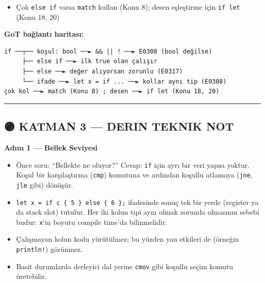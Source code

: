 \documentclass[12pt,a4paper]{article}
\newenvironment{Shaded}{}{}
\newcommand{\ControlFlowTok}[1]{\textcolor[rgb]{0.00,0.44,0.13}{\textbf{#1}}}
\newcommand{\DecValTok}[1]{\textcolor[rgb]{0.25,0.63,0.44}{#1}}
\newcommand{\NormalTok}[1]{#1}
\newcommand{\OperatorTok}[1]{\textcolor[rgb]{0.40,0.40,0.40}{#1}}
\begin{document}
\begin{itemize}
\begin{Shaded}
\begin{Highlighting}[]
\ControlFlowTok{if}\NormalTok{ a }\OperatorTok{\textgreater{}} \DecValTok{0} \OperatorTok{\&\&} \OperatorTok{(}\NormalTok{b }\OperatorTok{\textgreater{}} \DecValTok{0} \OperatorTok{||}\NormalTok{ c }\OperatorTok{\textgreater{}} \DecValTok{0}\OperatorTok{)} \OperatorTok{\{} \OperatorTok{\}}
\end{Highlighting}
\end{Shaded}


  İlgili: kısa devre (Konu 5)
\item
  Çok \texttt{else\ if} varsa \texttt{match} kullan (Konu 8); desen eşleştirme için \texttt{if\ let} (Konu 18, 20)
\end{itemize}

\textbf{GoT bağlantı haritası:}

\begin{verbatim}
if ──┬── koşul: bool ──► && || ! ──► E0308 (bool değilse)
     ├── else if ──► ilk true olan çalışır
     ├── else ──► değer alıyorsan zorunlu (E0317)
     └── ifade ──► let x = if ... ──► kollar aynı tip (E0308)
çok kol ──► match (Konu 8) ; desen ──► if let (Konu 18, 20)
\end{verbatim}

\begin{center}\rule{0.5\linewidth}{0.5pt}\end{center}

\subsection{🟣 KATMAN 3 --- DERIN TEKNIK NOT}\label{katman-3-—-derin-teknik-not-6}

\textbf{Adım 1 --- Bellek Seviyesi}

\begin{itemize}
\tightlist
\item
  Önce soru: ``Bellekte ne oluyor?'' Cevap: \texttt{if} için ayrı bir veri yapısı yoktur. Koşul bir karşılaştırma (\texttt{cmp}) komutuna ve ardından koşullu atlamaya (\texttt{jne}, \texttt{jle} gibi) dönüşür.
\item
  \texttt{let\ x\ =\ if\ c\ \{\ 5\ \}\ else\ \{\ 6\ \};} ifadesinde sonuç tek bir yerde (register ya da stack slot) tutulur. Her iki kolun tipi aynı olmak zorunda olmasının sebebi budur: \texttt{x}`in boyutu compile time'da bilinmelidir.
\item
  Çalışmayan kolun kodu yürütülmez; bu yüzden yan etkileri de (örneğin \texttt{println!}) görünmez.
\item
  Basit durumlarda derleyici dal yerine \texttt{cmov} gibi koşullu seçim komutu üretebilir.
\end{itemize}
\end{document}
